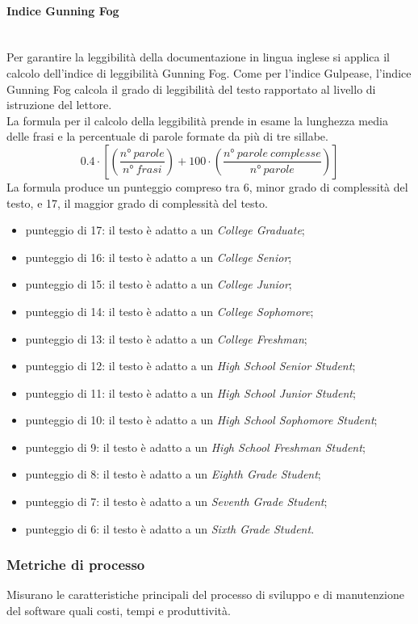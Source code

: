 \paragraph{Indice Gunning Fog}\mbox{}\\
Per garantire la leggibilità della documentazione in lingua inglese si applica il calcolo dell'indice di leggibilità Gunning Fog. Come per l'indice Gulpease, l'indice Gunning Fog calcola il grado di leggibilità del testo rapportato al livello di istruzione del lettore.\\
La formula per il calcolo della leggibilità prende in esame la lunghezza media delle frasi e la percentuale di parole formate da più di tre sillabe.
\[ 0.4 \cdot \left[\left(\frac{n°\ parole}{n°\ frasi}\right)+100 \cdot \left(\frac{n°\ parole\ complesse}{n°\ parole}\right)\right] \]
La formula produce un punteggio compreso tra 6, minor grado di complessità del testo, e 17, il maggior grado di complessità del testo.
\begin{itemize}
	\item punteggio di 17: il testo è adatto a un \textit{College Graduate};
	\item punteggio di 16: il testo è adatto a un \textit{College Senior};
	\item punteggio di 15: il testo è adatto a un \textit{College Junior};
	\item punteggio di 14: il testo è adatto a un \textit{College Sophomore};
	\item punteggio di 13: il testo è adatto a un \textit{College Freshman};
	\item punteggio di 12: il testo è adatto a un \textit{High School Senior Student}; 
	\item punteggio di 11: il testo è adatto a un \textit{High School Junior Student};
	\item punteggio di 10: il testo è adatto a un \textit{High School Sophomore Student};
	\item punteggio di 9: il testo è adatto a un \textit{High School Freshman Student};
	\item punteggio di 8: il testo è adatto a un \textit{Eighth Grade Student};
	\item punteggio di 7: il testo è adatto a un \textit{Seventh Grade Student};
	\item punteggio di 6: il testo è adatto a un \textit{Sixth Grade Student}.
\end{itemize}

\subsubsection{Metriche di processo}\label{sec:metriche_processo}
Misurano le caratteristiche principali del processo di sviluppo e di manutenzione del software quali costi, tempi e produttività.


